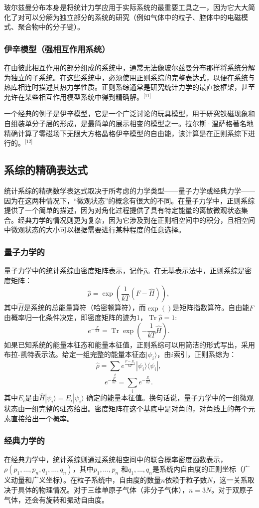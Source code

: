 玻尔兹曼分布本身是将统计力学应用于实际系统的最重要工具之一，因为它大大简化了对可以分解为独立部分的系统的研究（例如气体中的粒子、腔体中的电磁模式、聚合物中的分子键）。
\subsubsection{伊辛模型（强相互作用系统）}  
在由彼此相互作用的部分组成的系统中，通常无法像玻尔兹曼分布那样将系统分解为独立的子系统。在这些系统中，必须使用正则系综的完整表达式，以便在系统与热库相连时描述其热力学性质。正则系综通常是研究统计力学的最直接框架，甚至允许在某些相互作用模型系统中得到精确解。\(^\text{[11]}\)

一个经典的例子是伊辛模型，它是一个广泛讨论的玩具模型，用于研究铁磁现象和自组装单分子层的形成，是最简单的展示相变的模型之一。拉尔斯·温萨格著名地精确计算了零磁场下无限大方格晶格伊辛模型的自由能，该计算是在正则系综下进行的。\(^\text{[12]}\)
\subsection{系综的精确表达式}
统计系综的精确数学表达式取决于所考虑的力学类型——量子力学或经典力学——因为在这两种情况下，“微观状态”的概念有很大的不同。在量子力学中，正则系综提供了一个简单的描述，因为对角化过程提供了具有特定能量的离散微观状态集合。经典力学的情况则更为复杂，因为它涉及到在正则相空间中的积分，且相空间中微观状态的大小可以根据需要进行某种程度的任意选择。
\subsubsection{量子力学的}
量子力学中的统计系综由密度矩阵表示，记作\(\hat{\rho}\)。在无基表示法中，正则系综是密度矩阵：
\[
\hat{\rho} = \exp \left( \frac{1}{kT} (F - \hat{H}) \right),~
\]
其中\(\hat{H}\)是系统的总能量算符（哈密顿算符），而\(\exp()\)是矩阵指数算符。自由能\(F\)由概率归一化条件决定，即密度矩阵的迹为1，\(\operatorname{Tr} \hat{\rho} = 1:\)
\[
e^{- \frac{F}{kT}} = \operatorname{Tr} \exp \left( - \frac{1}{kT} \hat{H} \right).~
\]
如果已知系统的能量本征态和能量本征值，正则系综可以用简洁的形式写出，采用布拉-凯特表示法。给定一组完整的能量本征态\(|\psi_i\rangle\)，由\(i\)索引，正则系综为：
\[
\hat{\rho} = \sum_{i} e^{\frac{F - E_i}{kT}} |\psi_i \rangle \langle \psi_i |,~
\]
\[
e^{- \frac{F}{kT}} = \sum_{i} e^{- \frac{E_i}{kT}}.~
\]
其中\( E_i \)是由\(\hat{H} |\psi_i\rangle = E_i |\psi_i\rangle \) 确定的能量本征值。换句话说，量子力学中的一组微观状态由一组完整的驻态给出。密度矩阵在这个基底中是对角的，对角线上的每个元素直接给出一个概率。
\subsubsection{经典力学的}
在经典力学中，统计系综则通过系统相空间中的联合概率密度函数表示，\( \rho(p_1, \dots, p_n, q_1, \dots, q_n) \)，其中\( p_1, \dots, p_n \) 和\( q_1, \dots, q_n \)是系统内自由度的正则坐标（广义动量和广义坐标）。在粒子系统中，自由度的数量\( n \)依赖于粒子数\( N \)，这一关系取决于具体的物理情况。对于三维单原子气体（非分子气体），\( n = 3N \)。对于双原子气体，还会有旋转和振动自由度。

